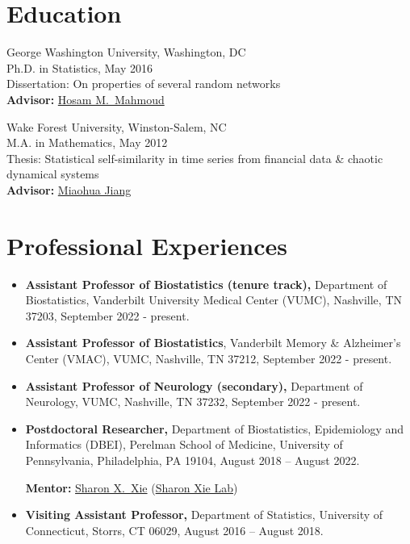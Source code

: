 \documentclass{res}
\begin{document}
\begin{resume} 
	
\section{Education} 
George Washington University, Washington, DC \\
Ph.D. in Statistics, May 2016 \\
Dissertation: On properties of several random networks \\
{\bf Advisor:} 
\href{https://statistics.columbian.gwu.edu/hosam-m-mahmoud}
{Hosam M.\ Mahmoud}

Wake Forest University, Winston-Salem, NC \\
M.A. in Mathematics, May 2012 \\
Thesis: Statistical self-similarity in time series from financial 
data \& chaotic dynamical systems \\
{\bf Advisor:} \href{https://math.wfu.edu/jiang}{Miaohua Jiang}

\section{Professional Experiences}
\begin{itemize}
	\item {\bf Assistant Professor of Biostatistics (tenure track),} Department of 
	Biostatistics, Vanderbilt University Medical 
	Center (VUMC), Nashville, TN 37203, September 2022 - present.
	\item {\bf Assistant Professor of Biostatistics}, Vanderbilt 
	Memory \& Alzheimer's Center (VMAC), VUMC, Nashville, TN 37212, 
	September 2022 - present.
	\item {\bf Assistant Professor of Neurology (secondary),} Department of Neurology, VUMC, Nashville, TN 37232, September 2022 - present. 
	\item {\bf Postdoctoral Researcher,} Department of 
	Biostatistics, Epidemiology and Informatics (DBEI), Perelman 
	School of Medicine, University of Pennsylvania, Philadelphia, PA 
	19104, 
	August 2018 -- August 2022.
	
	{\bf Mentor:} 
	\href{https://www.med.upenn.edu/apps/faculty/index.php/g275/
		p9964}{Sharon X.\ Xie} 
		(\href{https://sites.google.com/view/sharonxielab/
		home?authuser=0}{Sharon Xie Lab})
	
	\item {\bf Visiting Assistant Professor,} Department of 
	Statistics, University of Connecticut, Storrs, CT 06029, August 
	2016 
	-- August 2018.
	

\end{itemize}
\end{resume}
\end{document}
